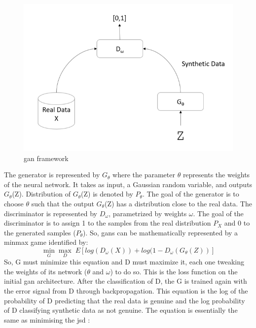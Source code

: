\begin{figure}
\centering
\includegraphics[scale=0.75]{figures/image.png}

\caption{\ac{gan} framework} \label{fig:gan-arch}
\end{figure}
The generator is represented by $G_{\theta}$ where the parameter $\theta$ represents the weights of
the neural network. It takes as input, a Gaussian random variable, and outputs $G_{\theta}$(Z).
Distribution of $G_{\theta}$(Z) is denoted by $P_{\theta}$. The goal of the generator is to choose $\theta$ such that the output $G_{\theta}$(Z) has a distribution close to the real data. The discriminator is represented by $D_{\omega}$, parametrized by weights $\omega$. The goal of the discriminator is to assign 1 to the samples from the real distribution $P_{X}$ and 0 to the generated samples ($P_{\theta}$). So, \acp{gan} can be mathematically represented by a minmax game identified by:
\begin{equation}
\min_{G}\max_{D} \; E [log(D_{\omega}(X)) + log(1-D_{\omega}(G_{\theta}(Z))]
\end{equation}
So, G must minimize this equation and D must maximize it, each one tweaking the weights of its network ($\theta$ and $\omega$) to do so. This is the loss function on the initial \ac{gan} architecture. After the classification of D, the G is trained again with the error signal from D through backpropagation. This equation is the log of the probability of D predicting that the real data is genuine and the log probability of D classifying synthetic data as not genuine. The equation is essentially the same as minimising the \ac{jsd} \cite{goodfellow_generative_2014}:

